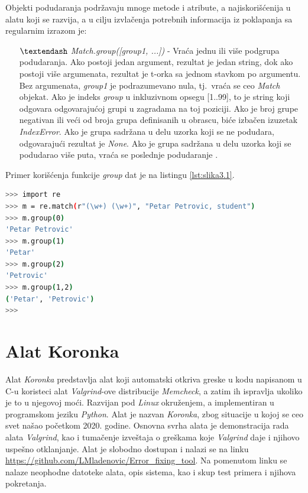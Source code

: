 \documentclass[12pt,oneside]{memoir}
\theoremstyle{plain}
\theoremstyle{definition}
\begin{document}
Objekti podudaranja podržavaju mnoge metode i atribute, a najiskorišćenija u alatu koji se razvija, a u cilju izvlačenja potrebnih informacija iz poklapanja sa regularnim izrazom je:
\begin{itemize}
\item[$\textendash$]  \textit{Match.group([group1, ...])} - Vraća jednu ili više podgrupa podudaranja. Ako postoji jedan argument, rezultat je jedan string, dok ako postoji više argumenata, rezultat je t-orka sa jednom stavkom po argumentu. Bez argumenata, \textit{group1} je  podrazumevano nula, tj.~vraća se ceo \textit{Match} objekat. Ako je indeks \textit{group} u inkluzivnom opsegu [1..99], to je string koji odgovara odgovarajućoj grupi u zagradama na toj poziciji. Ako je broj grupe negativan ili veći od broja grupa definisanih u obrascu, biće izbačen izuzetak \textit{IndexError}. Ako je grupa sadržana u delu uzorka koji se ne podudara, odgovarajući rezultat je \textit{None}. Ako je grupa sadržana u delu uzorka koji se podudarao više puta, vraća se poslednje podudaranje \cite{reModule}.
\end{itemize}

Primer korišćenja funkcije \textit{group} dat je na listingu \ref{lst:slika3.1}.

\begin{lstlisting}[style=terminal,caption={Primer korišćenja funkcije \textit{group} modula \textit{re}}, label={lst:slika3.1},language={bash}] 
>>> import re
>>> m = re.match(r"(\w+) (\w+)", "Petar Petrovic, student")
>>> m.group(0)
'Petar Petrovic'
>>> m.group(1)
'Petar'
>>> m.group(2)
'Petrovic'
>>> m.group(1,2)
('Petar', 'Petrovic')
>>>
\end{lstlisting}


\chapter{Alat Koronka}
Alat \textit{Koronka} predstavlja alat koji automatski otkriva greske u kodu napisanom u C-u koristeci alat \textit{Valgrind}-ove distribucije \textit{Memcheck}, a zatim ih ispravlja ukoliko je to u njegovoj moći. Razvijan pod \textit{Linux} okruženjem, a implementiran u programskom jeziku \textit{Python}. Alat je nazvan \textit{Koronka}, zbog situacije u kojoj se ceo svet našao početkom 2020. godine. Osnovna svrha alata je demonstracija rada alata \textit{Valgrind}, kao i tumačenje izveštaja o greškama koje \textit{Valgrind} daje i njihovo uspešno otklanjanje. Alat je slobodno dostupan i nalazi se na linku \url{https://github.com/LMladenovic/Error_fixing_tool}. Na pomenutom linku se nalaze neophodne datoteke alata, opis sistema, kao i skup test primera i njihova pokretanja.
\end{document}
